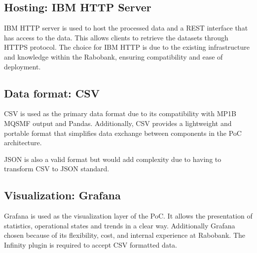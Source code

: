 \subsection{Hosting: IBM HTTP Server}
IBM HTTP server is used to host the processed data and a REST interface that has access to the data. This allows 
clients to retrieve the datasets through HTTPS protocol. The choice for IBM HTTP is due to the existing infrastructure and 
knowledge within the Rabobank, ensuring compatibility and ease of deployment.

\subsection{Data format: CSV}
CSV is used as the primary data format due to its compatibility with MP1B MQSMF output and Pandas. Additionally, CSV provides 
a lightweight and portable format that simplifies data exchange between components in  the PoC architecture.

JSON is also a valid format but would add complexity due to having to transform CSV to JSON standard. 
\subsection{Visualization: Grafana}
Grafana is used as the visualization layer of the PoC. It allows the presentation of statistics, operational states and trends in a clear way. 
Additionally Grafana chosen because of its flexibility, cost, and internal experience at Rabobank. The Infinity plugin is required to accept CSV formatted data.




